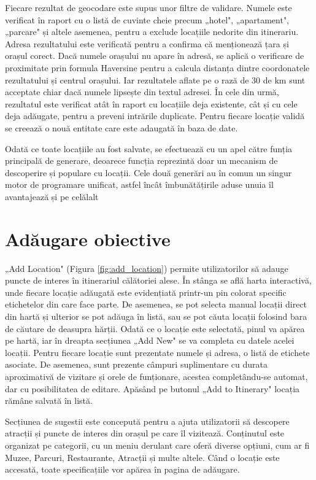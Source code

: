 Fiecare rezultat de geocodare este supus unor filtre de validare. Numele este verificat în raport cu o listă de cuvinte cheie precum „hotel", „apartament", „parcare" și altele asemenea, pentru a exclude locațiile nedorite din itinerariu. Adresa rezultatului este verificată pentru a confirma că menționează țara și orașul corect. Dacă numele orașului nu apare în adresă, se aplică o verificare de proximitate prin formula Haversine pentru a calcula distanța dintre coordonatele rezultatului și centrul orașului. Iar rezultatele aflate pe o rază de 30 de km sunt acceptate chiar dacă numele lipsește din textul adresei. În cele din urmă, rezultatul este verificat atât în raport cu locațiile deja existente, cât și cu cele deja adăugate, pentru a preveni intrările duplicate. Pentru fiecare locație validă se creează o nouă entitate care este adaugată în baza de date.

Odată ce toate locațiile au fost salvate, se efectuează cu un apel către funția principală de generare, deoarece funcția reprezintă doar un mecanism de descoperire și populare cu locații. Cele două generări au în comun un singur motor de programare unificat, astfel încât îmbunătățirile aduse unuia îl avantajează și pe celălalt

\section{Adăugare obiective}
„Add Location" (Figura \ref{fig:add_location}) permite utilizatorilor să adauge puncte de interes în itinerariul călătoriei alese. În stânga se află harta interactivă, unde fiecare locație adăugată este evidențiată printr-un pin colorat specific etichetelor din care face parte. De asemenea, se pot selecta manual locații direct din hartă și ulterior se pot adăuga în listă, sau se pot căuta locații folosind bara de căutare de deasupra hărții. Odată ce o locație este selectată, pinul va apărea pe hartă, iar în dreapta secțiunea „Add New" se va completa cu datele acelei locații. Pentru fiecare locație sunt prezentate numele și adresa, o listă de etichete asociate. De asemenea, sunt prezente câmpuri suplimentare cu durata aproximativă de vizitare și orele de funționare, acestea completându-se automat, dar cu posibilitatea de editare. Apăsând pe butonul „Add to Itinerary" locația rămâne salvată în listă.

Secțiunea de sugestii este concepută pentru a ajuta utilizatorii să descopere atracții și puncte de interes din orașul pe care îl vizitează. Conținutul este organizat pe categorii, cu un meniu derulant care oferă diverse opțiuni, cum ar fi Muzee, Parcuri, Restaurante, Atracții și multe altele. Când o locație este accesată, toate specificațiile vor apărea în pagina de adăugare.

